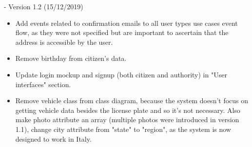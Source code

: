 - Version 1.2 (15/12/2019)
\begin{itemize}
	\item Add events related to confirmation emails to all user types use cases event flow, as they were not specified but are important to ascertain that the address is accessible by the user.
	\item Remove birthday from citizen's data.
	\item Update login mockup and signup (both citizen and authority) in "User interfaces" section.
	\item Remove vehicle class from class diagram, because the system doesn't focus on getting vehicle data besides the license plate and so it's not necessary. Also make photo attribute an array (multiple photos were introduced in version 1.1), change city attribute from "state" to "region", as the system is now designed to work in Italy.
\end{itemize}